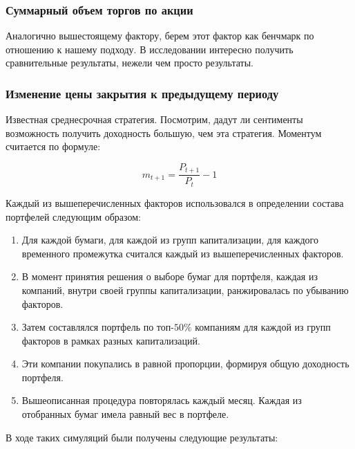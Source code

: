\documentclass{article}
\begin{document}
\subsubsection{Суммарный объем торгов по акции}

Аналогично вышестоящему фактору, берем этот фактор как бенчмарк по отношению к нашему подходу. В исследовании интересно получить сравнительные результаты, нежели чем просто результаты.

\subsubsection{Изменение цены закрытия к предыдущему периоду}
Известная среднесрочная стратегия. Посмотрим, дадут ли сентименты возможность получить доходность большую, чем эта стратегия. Моментум считается по формуле:

\begin{equation*}
	m_{t+1} = \frac{P_{t+1}}{P_{t}} - 1
\end{equation*}

Каждый из вышеперечисленных факторов использовался в определении состава портфелей следующим образом:

\begin{enumerate}
	\item Для каждой бумаги, для каждой из групп капитализации, для каждого временного промежутка считался каждый из вышеперечисленных факторов. 
	\item В момент принятия решения о выборе бумаг для портфеля, каждая из компаний, внутри своей группы капитализации, ранжировалась по убыванию факторов.
	\item Затем составлялся портфель по топ-$50\%$ компаниям для каждой из групп факторов в рамках разных капитализаций.
	\item Эти компании покупались в равной пропорции, формируя общую доходность портфеля.
	\item Вышеописанная процедура повторялась каждый месяц. Каждая из отобранных бумаг имела равный вес в портфеле.
\end{enumerate}
В ходе таких симуляций были получены следующие результаты:
\end{document}
